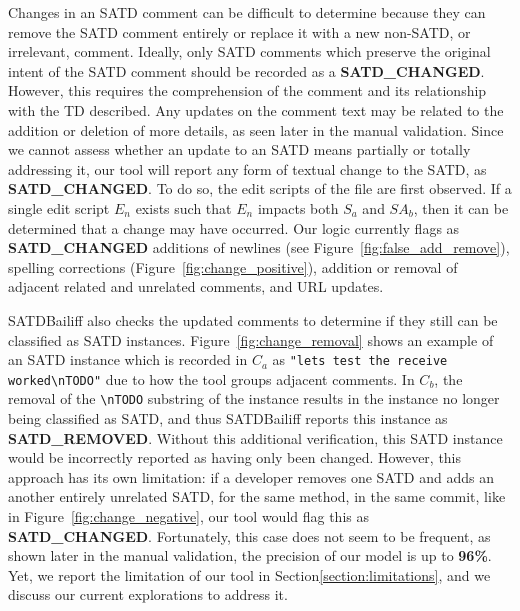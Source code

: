 \documentclass[3p]{elsarticle}
\newcommand{\approach}{SATDBailiff\xspace}
\begin{document}
\begin{enumerate}
Changes in an SATD comment can be difficult to determine because they can remove the SATD comment entirely or replace it with a new non-SATD, or irrelevant, comment. Ideally, only SATD comments which preserve the original intent of the SATD comment should be recorded as a \textbf{SATD\_CHANGED}. However, this requires the comprehension of the comment and its relationship with the TD described. Any updates on the comment text may be related to the addition or deletion of more details, as seen later in the manual validation. Since we cannot assess whether an update to an SATD means partially or totally addressing it, our tool will report any form of textual change to the SATD, as \textbf{SATD\_CHANGED}. To do so, the edit scripts of the file are first observed. If a single edit script $E_n$ exists such that $E_n$ impacts both $S_a$ and $SA_b$, then it can be determined that a change may have occurred. Our logic currently flags as \textbf{SATD\_CHANGED} additions of newlines (see Figure~\ref{fig:false_add_remove}), spelling corrections (Figure~\ref{fig:change_positive}), addition or removal of adjacent related and unrelated comments, and URL updates. %
\begin{sloppypar}
\approach also checks the updated comments to determine if they still can be classified as SATD instances. Figure~\ref{fig:change_removal} shows an example of an SATD instance which is recorded in $C_a$ as \lstinline{"lets test the receive worked\nTODO"} due to how the tool groups adjacent comments. In $C_b$, the removal of the \lstinline{\nTODO} substring of the instance results in the instance no longer being classified as SATD, and thus \approach reports this instance as \textbf{SATD\_REMOVED}. %
Without this additional verification, this SATD instance would be incorrectly reported as having only been changed. However, this approach has its own limitation: if a developer removes one SATD and adds an another entirely unrelated SATD, for the same method, in the same commit, like in Figure~\ref{fig:change_negative}, our tool would flag this as \textbf{SATD\_CHANGED}. Fortunately, this case does not seem to be frequent, as shown later in the manual validation, the precision of our model is up to \textbf{96\%}. Yet, we report the limitation of our tool in Section\ref{section:limitations}, and we discuss our current explorations to address it.
\end{sloppypar} 


\end{enumerate}
\end{document}
